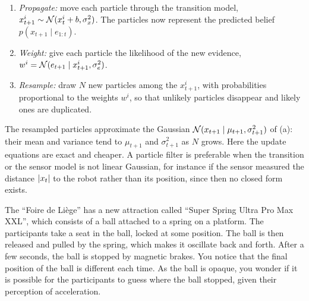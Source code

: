 \documentclass[11pt, a4paper]{exam}
\begin{document}
\begin{exercises}
\begin{parts}
    \begin{solution}
        \begin{enumerate}
            \item \emph{Propagate:} move each particle through the transition model, $x_{t+1}^i \sim \mathcal{N}(x_t^i + b, \sigma_x^2)$. The particles now represent the predicted belief $p(x_{t+1} \mid e_{1:t})$.
            \item \emph{Weight:} give each particle the likelihood of the new evidence, $w^i = \mathcal{N}(e_{t+1} \mid x_{t+1}^i, \sigma_e^2)$.
            \item \emph{Resample:} draw $N$ new particles among the $x_{t+1}^i$, with probabilities proportional to the weights $w^i$, so that unlikely particles disappear and likely ones are duplicated.
        \end{enumerate}
        The resampled particles approximate the Gaussian $\mathcal{N}(x_{t+1} \mid \mu_{t+1}, \sigma_{t+1}^2)$ of (a): their mean and variance tend to $\mu_{t+1}$ and $\sigma_{t+1}^2$ as $N$ grows. Here the update equations are exact and cheaper. A particle filter is preferable when the transition or the sensor model is not linear Gaussian, for instance if the sensor measured the distance $\lvert x_t\rvert$ to the robot rather than its position, since then no closed form exists.
    \end{solution}
\end{parts}


The \enquote{Foire de Liège} has a new attraction called \enquote{Super Spring Ultra Pro Max XXL}, which consists of a ball attached to a spring on a platform. The participants take a seat in the ball, locked at some position. The ball is then released and pulled by the spring, which makes it oscillate back and forth. After a few seconds, the ball is stopped by magnetic brakes. You notice that the final position of the ball is different each time. As the ball is opaque, you wonder if it is possible for the participants to guess where the ball stopped, given their perception of acceleration.


\end{exercises}
\end{document}
